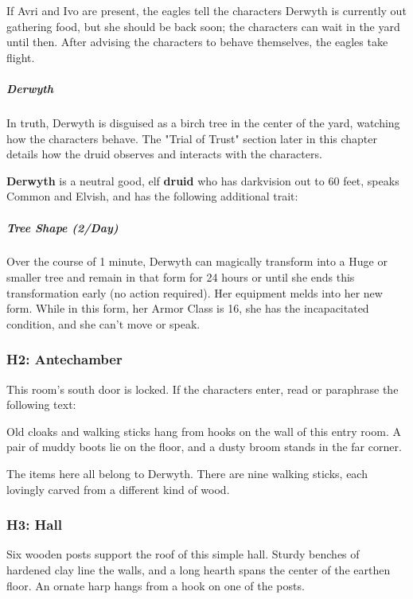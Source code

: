 \documentclass[10pt,a4paper,twoside,bg=print,twocolumn,openany,nodeprecatedcode]{dndbook}
\begin{document}
If Avri and Ivo are present, the eagles tell the characters Derwyth is currently out gathering food, but she should be back soon; the characters can wait in the yard until then. After advising the characters to behave themselves, the eagles take flight.

\subparagraph{Derwyth}
In truth, Derwyth is disguised as a birch tree in the center of the yard, watching how the characters behave. The "Trial of Trust" section later in this chapter details how the druid observes and interacts with the characters.

\textbf{Derwyth} is a neutral good, elf \textbf{druid} who has darkvision out to 60 feet, speaks Common and Elvish, and has the following additional trait:

\begin{DndReadAloud}{}
\subparagraph{Tree Shape (2/Day)}
Over the course of 1 minute, Derwyth can magically transform into a Huge or smaller tree and remain in that form for 24 hours or until she ends this transformation early (no action required). Her equipment melds into her new form. While in this form, her Armor Class is 16, she has the incapacitated condition, and she can't move or speak.

\end{DndReadAloud}

\subsubsection{H2: Antechamber}
This room's south door is locked. If the characters enter, read or paraphrase the following text:

\begin{DndReadAloud}{}
Old cloaks and walking sticks hang from hooks on the wall of this entry room. A pair of muddy boots lie on the floor, and a dusty broom stands in the far corner.

\end{DndReadAloud}

The items here all belong to Derwyth. There are nine walking sticks, each lovingly carved from a different kind of wood.

\subsubsection{H3: Hall}
\begin{DndReadAloud}{}
Six wooden posts support the roof of this simple hall. Sturdy benches of hardened clay line the walls, and a long hearth spans the center of the earthen floor. An ornate harp hangs from a hook on one of the posts.

\end{DndReadAloud}
\end{document}
